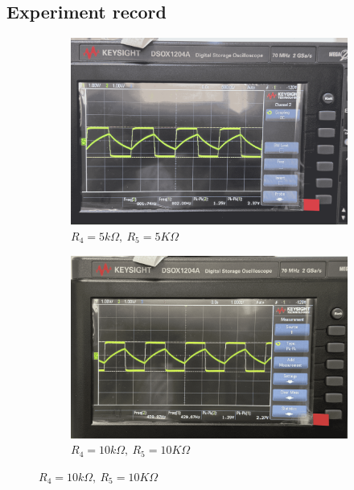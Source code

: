 \subsection{Experiment record}
\begin{figure}[H]
    \centering
    \begin{subfigure}{0.45\linewidth}
        \includegraphics[width=0.95\linewidth]{Experiment_15/Images/5k5k.png}
        \caption{$R_4=5k\Omega,~R_5=5K\Omega$}
        \label{wave:15-5k5k}
    \end{subfigure}
    \begin{subfigure}{0.45\linewidth}
        \includegraphics[width=0.95\linewidth]{Experiment_15/Images/10k10k.png}
        \caption{$R_4=10k\Omega,~R_5=10K\Omega$}
        \label{wave:15-10k10k}
    \end{subfigure}


\end{figure}
